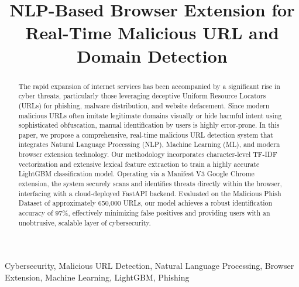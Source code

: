 \documentclass[conference]{IEEEtran}
\begin{document}
\title{NLP-Based Browser Extension for Real-Time Malicious URL and Domain Detection
}

\author{
\and
{}
\and
{}
}

\maketitle

\begin{abstract}
The rapid expansion of internet services has been accompanied by a significant rise in cyber threats, particularly those leveraging deceptive Uniform Resource Locators (URLs) for phishing, malware distribution, and website defacement. Since modern malicious URLs often imitate legitimate domains visually or hide harmful intent using sophisticated obfuscation, manual identification by users is highly error-prone. In this paper, we propose a comprehensive, real-time malicious URL detection system that integrates Natural Language Processing (NLP), Machine Learning (ML), and modern browser extension technology. Our methodology incorporates character-level TF-IDF vectorization and extensive lexical feature extraction to train a highly accurate LightGBM classification model. Operating via a Manifest V3 Google Chrome extension, the system securely scans and identifies threats directly within the browser, interfacing with a cloud-deployed FastAPI backend. Evaluated on the Malicious Phish Dataset of approximately 650,000 URLs, our model achieves a robust identification accuracy of 97\%, effectively minimizing false positives and providing users with an unobtrusive, scalable layer of cybersecurity. 
\end{abstract}

\begin{IEEEkeywords}
Cybersecurity, Malicious URL Detection, Natural Language Processing, Browser Extension, Machine Learning, LightGBM, Phishing
\end{IEEEkeywords}
\end{document}
